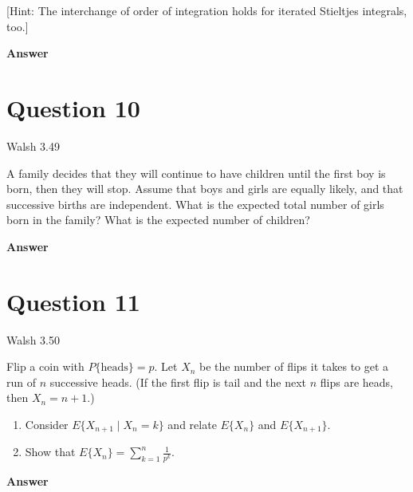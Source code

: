 \documentclass[letterpaper]{article}
\begin{document}
		[Hint: The interchange of order of integration holds for iterated Stieltjes integrals, too.]
		
		
		\textbf{Answer}
		
		\clearpage
		
		
		\section{Question 10}
		
		{\color{deepred} Walsh 3.49}
		
		A family decides that they will continue to have children until the first boy is born, then they will stop. Assume that boys and girls are equally likely, and that successive births are independent. What is the expected total number of girls born in the family? What is the expected number of children?
		
		
		
		\textbf{Answer}
		
		\clearpage
		
		\section{Question 11}
		
		{\color{deepred} Walsh 3.50}
		
		Flip a coin with $P\{\text{heads}\} = p$. Let $X_n$ be the number of flips it takes to get a run of $n$ successive heads. (If the first flip is tail and the next $n$ flips are heads, then $X_n = n + 1$.)
		
		\begin{enumerate}
			\item[(a)] Consider $E\{X_{n+1} \mid X_n = k\}$ and relate $E\{X_n\}$ and $E\{X_{n+1}\}$.
			
			\item[(b)] Show that $E\{X_n\} = \sum_{k=1}^n \frac{1}{p^k}$.
		\end{enumerate}
		
		
		\textbf{Answer}
		
		\clearpage
		
		
		
		
		
	
\end{document}
